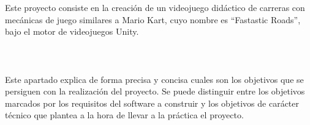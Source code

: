 Este proyecto consiste en la creación de un videojuego didáctico de carreras con mecánicas de juego similares a Mario Kart, cuyo nombre es “Fastastic Roads”, bajo el motor de videojuegos Unity. 
\\\\
\\\\
Este apartado explica de forma precisa y concisa cuales son los objetivos que se persiguen con la realización del proyecto. Se puede distinguir entre los objetivos marcados por los requisitos del software a construir y los objetivos de carácter técnico que plantea a la hora de llevar a la práctica el proyecto.
